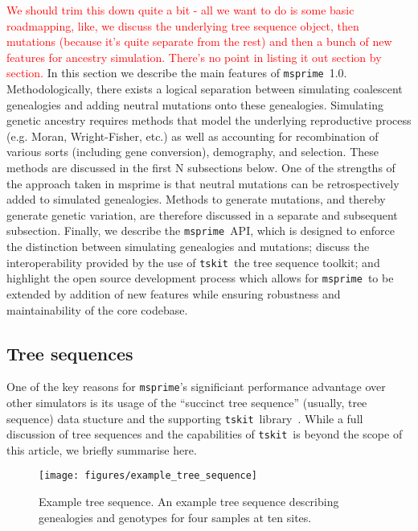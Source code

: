 \documentclass{article}
\newcommand{\msprime}[0]{\texttt{msprime}}
\newcommand{\tskit}[0]{\texttt{tskit}}
\newcommand{\jkcomment}[1]{\textcolor{red}{#1}}
\begin{document}
\jkcomment{We should trim this down quite a bit - all we want to do is some basic
roadmapping, like, we discuss the underlying tree sequence object,
then mutations (because it's quite separate from the rest)
and then a bunch of new features for ancestry simulation. There's no
point in listing it out section by section.}
In this section we describe the main features of \msprime\ 1.0. Methodologically,
there exists a logical separation between simulating coalescent genealogies and
adding neutral mutations onto these genealogies. Simulating genetic ancestry
requires methods that model the underlying reproductive process (e.g. Moran,
Wright-Fisher, etc.) as well as accounting for recombination of various sorts
(including gene conversion), demography, and selection. These methods are
discussed in the first N subsections below. One of the strengths of the
approach taken in msprime is that neutral mutations can be retrospectively
added to simulated genealogies. Methods to generate mutations, and thereby
generate genetic variation, are therefore discussed in a separate and subsequent
subsection. Finally, we describe the \msprime\ API, which is designed to enforce
the distinction between simulating genealogies and mutations; discuss the
interoperability provided by the use of \tskit\, the tree sequence toolkit;
and highlight the open source development process which allows for \msprime\
to be extended by addition of new features while ensuring robustness and
maintainability of the core codebase.

\subsection*{Tree sequences}
One of the key reasons for \msprime's significiant performance advantage
over other simulators is its usage of the ``succinct tree sequence''
(usually, tree sequence) data stucture and the supporting \tskit\
library~\citep{tskit2021tskit}.
While a full discussion of tree sequences and the capabilities
of \tskit\ is beyond the scope of this article, we briefly summarise
here.

\begin{figure}
\begin{center}
\texttt{[image: figures/example\_tree\_sequence]}
\end{center}
\caption{\label{fig-ts-example} Example tree sequence.
An example tree sequence describing genealogies and genotypes
for four samples at ten sites.
}
\end{figure}
\end{document}
